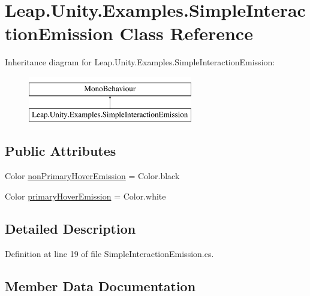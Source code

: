 \hypertarget{class_leap_1_1_unity_1_1_examples_1_1_simple_interaction_emission}{}\section{Leap.\+Unity.\+Examples.\+Simple\+Interaction\+Emission Class Reference}
\label{class_leap_1_1_unity_1_1_examples_1_1_simple_interaction_emission}
Inheritance diagram for Leap.\+Unity.\+Examples.\+Simple\+Interaction\+Emission\+:\begin{figure}[H]
\begin{center}
\leavevmode
\includegraphics[height=2.000000cm]{class_leap_1_1_unity_1_1_examples_1_1_simple_interaction_emission}
\end{center}
\end{figure}
\subsection*{Public Attributes}
\begin{DoxyCompactItemize}
\item 
Color \mbox{\hyperlink{class_leap_1_1_unity_1_1_examples_1_1_simple_interaction_emission_a6404da24d1de43380d32d9fdd5694cd1}{non\+Primary\+Hover\+Emission}} = Color.\+black
\item 
Color \mbox{\hyperlink{class_leap_1_1_unity_1_1_examples_1_1_simple_interaction_emission_acfeba38a462c1a9ae7900144acf08e29}{primary\+Hover\+Emission}} = Color.\+white
\end{DoxyCompactItemize}


\subsection{Detailed Description}


Definition at line 19 of file Simple\+Interaction\+Emission.\+cs.



\subsection{Member Data Documentation}
\mbox{\label{class_leap_1_1_unity_1_1_examples_1_1_simple_interaction_emission_a6404da24d1de43380d32d9fdd5694cd1}} 
